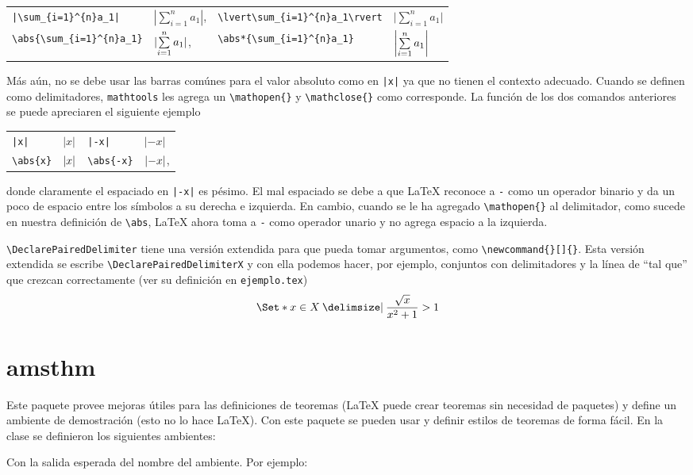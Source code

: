 \begin{tabular}{llll}
  \verb!|\sum_{i=1}^{n}a_1|! & \(|\sum\limits_{i=1}^{n}a_1|\), &
  \verb|\lvert\sum_{i=1}^{n}a_1\rvert| &
  \(\lvert\sum\limits_{i=1}^{n}a_1\rvert \) \\[4ex]
  \verb|\abs{\sum_{i=1}^{n}a_1}| & \(\abs{\sum\limits_{i=1}^{n}a_1}\), &
  \verb|\abs*{\sum_{i=1}^{n}a_1}| & \(\abs*{\sum\limits_{i=1}^{n}a_1}\)
\end{tabular}

Más aún, no se debe usar las barras comúnes para el valor absoluto como en \verb¡|x|¡ ya que no tienen el contexto adecuado. Cuando se definen como delimitadores, \texttt{mathtools} les agrega un \verb|\mathopen{}| y \verb|\mathclose{}| como corresponde. La función de los dos comandos anteriores se puede apreciaren el siguiente ejemplo

\begin{tabular}{llll}
  \verb¡|x|¡ & \(|x|\) & \verb¡|-x|¡ & \(|-x|\)\\
  \verb¡\abs{x}¡ & \(\abs{x}\) & \verb¡\abs{-x}¡ & \(\abs{-x}\),
\end{tabular}

\noindent donde claramente el espaciado en \verb¡|-x|¡ es pésimo. El mal espaciado se debe a que \LaTeX{} reconoce a \verb|-| como un operador binario y da un poco de espacio entre los símbolos a su derecha e izquierda. En cambio, cuando se le ha agregado \verb|\mathopen{}| al delimitador, como sucede en nuestra definición de \verb|\abs|, \LaTeX{} ahora toma a \verb|-| como operador unario y no agrega espacio a la izquierda.

\verb|\DeclarePairedDelimiter| tiene una versión extendida para que pueda
tomar argumentos, como \verb|\newcommand{}[]{}|. Esta versión extendida se
escribe \verb|\DeclarePairedDelimiterX| y con ella podemos hacer, por
ejemplo, conjuntos  con delimitadores y la línea de \enquote{tal que} que
crezcan correctamente (ver su definición en \texttt{ejemplo.tex})
\[
  \Set*{ x \in X \given \frac{\sqrt{x}}{x^2+1} > 1 }
\]


\section{amsthm}
Este paquete provee mejoras útiles para las definiciones de teoremas
(\LaTeX{} puede crear teoremas sin necesidad de paquetes) y
define un ambiente de demostración (esto no lo hace \LaTeX{}). Con este
paquete se pueden usar y definir estilos de teoremas de forma fácil. En la clase se definieron los siguientes ambientes:
\begin{center}
\end{center}
Con la salida esperada del nombre del ambiente. Por ejemplo:

